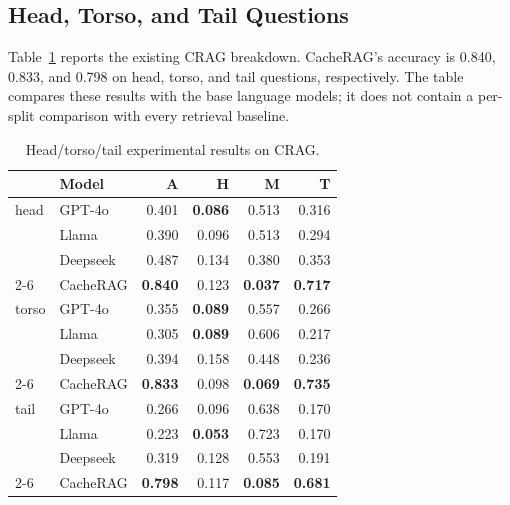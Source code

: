 \subsection{Head, Torso, and Tail Questions}
Table~\ref{tab:baseline_benchmarking_crag_full} reports the existing CRAG breakdown. CacheRAG's accuracy is 0.840, 0.833, and 0.798 on head, torso, and tail questions, respectively. The table compares these results with the base language models; it does not contain a per-split comparison with every retrieval baseline.
\begin{table}[!h]
  \caption{Head/torso/tail experimental results on CRAG.}
  \label{tab:baseline_benchmarking_crag_full}
\centering
\begin{tabular}{llrrrr}
\toprule &
 \textbf{Model} & \textbf{A} & \textbf{H} & \textbf{M} & \textbf{T} \\
\midrule
head & GPT-4o   &     0.401               &             \textbf{0.086}           &    0.513               &      0.316          \\
& Llama   &   0.390                 &         0.096               &        0.513           &    0.294            \\
& Deepseek & 0.487 & 0.134 & 0.380 & 0.353 \\
\cmidrule{2-6}
& CacheRAG   &     \textbf{0.840}               &  0.123                      &   \textbf{0.037}                &     \textbf{0.717}           \\
\midrule
torso & GPT-4o   &      0.355              &                 \textbf{0.089}       &    0.557               &       0.266         \\
& Llama   &      0.305              &     \textbf{0.089}                   &        0.606           &   0.217             \\
& Deepseek & 0.394 & 0.158 & 0.448 & 0.236 \\
\cmidrule{2-6}
& CacheRAG   &     \textbf{0.833}               &     0.098                   &      \textbf{0.069}             &     \textbf{0.735}          \\
\midrule
tail & GPT-4o   &        0.266            &    0.096                    &    0.638               &       0.170        \\
& Llama   &    0.223                &          \textbf{0.053}              &       0.723            &   0.170             \\
& Deepseek & 0.319 & 0.128 & 0.553 & 0.191 \\
\cmidrule{2-6}
& CacheRAG   &     \textbf{0.798}            &    0.117                    &   \textbf{0.085}              &  \textbf{0.681}             \\
\bottomrule
\end{tabular}
\end{table}

